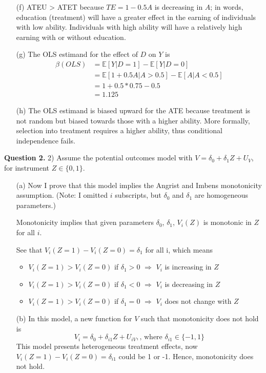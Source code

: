 \documentclass{article}
\theoremstyle{definition}
\begin{document}
\begin{itemize}
    \item[(f)] ATEU > ATET because $TE = 1-0.5A$ is decreasing in $A$; in words, education (treatment) will have a greater effect in the earning of individuals with low ability. Individuals with high ability will have a relatively high earning with or without education. 
    
    \item[(g)] The OLS estimand for the effect of $D$ on $Y$ is
    \begin{align*}
        \beta(OLS) &= \mathbb{E}[Y|D=1] - \mathbb{E}[Y|D=0]\\
                   &= \mathbb{E}[1+0.5A|A>0.5] - \mathbb{E}[A|A<0.5]\\
                   &= 1 + 0.5*0.75  - 0.5\\
                   &= 1.125
    \end{align*}
    
    \item[(h)] The OLS estimand is biased upward for the ATE because treatment is not random but biased towards those with a higher ability. More formally, selection into treatment requires a higher ability, thus conditional independence fails.

   \end{itemize}
   
    \noindent \hspace{0.41cm} \textbf{Question 2.}  2) Assume the potential outcomes model with $V=\delta_{0}+\delta_{1} Z+U_{V}$, for instrument $Z \in\{0,1\}$.
    \begin{itemize}
        \item[(a)] Now I prove that this model implies the Angrist and Imbens monotonicity assumption. (Note:  I omitted $i$ subscripts, but $\delta_{0}$ and $\delta_{1}$ are homogeneous parameters.)
        
        Monotonicity implies that given parameters $\delta_0$, $\delta_1$, $V_i(Z)$ is monotonic in $Z$ for all $i$.
        
        See that $V_i(Z=1)-V_i(Z=0) = \delta_1$ for all i, which means
        \begin{itemize}
            \item $V_i(Z=1)>V_i(Z=0)$ if $\delta_1>0$ $\Rightarrow$ $V_i$ is increasing in $Z$
            \item $V_i(Z=1)>V_i(Z=0)$ if $\delta_1<0$ $\Rightarrow$ $V_i$ is decreasing in $Z$
            \item $V_i(Z=1)>V_i(Z=0)$ if $\delta_1=0$ $\Rightarrow$ $V_i$ does not change with $Z$
        \end{itemize}
        
        \item[(b)] In this model, a new function for $V$ such that monotonicity does not hold is
        $$ V_i = \delta_{0}+\delta_{i1} Z +U_{iV}, \text{, where } \delta_{i1} \in \{-1,1\}$$
        This model presents heterogeneous treatment effects, now $V_i(Z=1)-V_i(Z=0) = \delta_{i1}$ could be 1 or -1. Hence, monotonicity does not hold. 
    \end{itemize}
    
\end{document}
